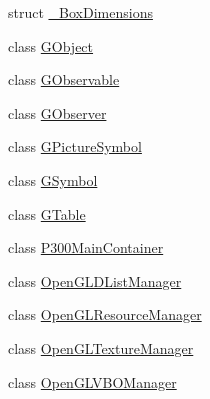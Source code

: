 \begin{DoxyCompactItemize}
struct \hyperlink{structOpenViBEApplications_1_1__BoxDimensions}{\_\-BoxDimensions}
\item 
class \hyperlink{classOpenViBEApplications_1_1GObject}{GObject}
\item 
class \hyperlink{classOpenViBEApplications_1_1GObservable}{GObservable}
\item 
class \hyperlink{classOpenViBEApplications_1_1GObserver}{GObserver}
\item 
class \hyperlink{classOpenViBEApplications_1_1GPictureSymbol}{GPictureSymbol}
\item 
class \hyperlink{classOpenViBEApplications_1_1GSymbol}{GSymbol}
\item 
class \hyperlink{classOpenViBEApplications_1_1GTable}{GTable}
\item 
class \hyperlink{classOpenViBEApplications_1_1P300MainContainer}{P300MainContainer}
\item 
class \hyperlink{classOpenViBEApplications_1_1OpenGLDListManager}{OpenGLDListManager}
\item 
class \hyperlink{classOpenViBEApplications_1_1OpenGLResourceManager}{OpenGLResourceManager}
\item 
class \hyperlink{classOpenViBEApplications_1_1OpenGLTextureManager}{OpenGLTextureManager}
\item 
class \hyperlink{classOpenViBEApplications_1_1OpenGLVBOManager}{OpenGLVBOManager}
\end{DoxyCompactItemize}
